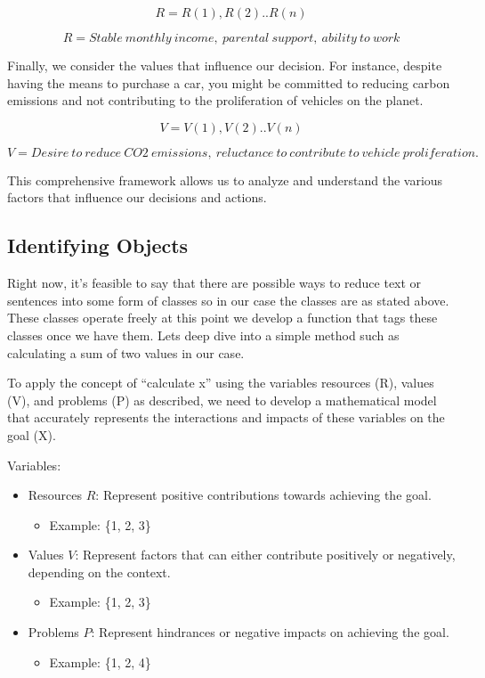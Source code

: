 \documentclass{article}
\begin{document}
	\[ 
	R= {R(1), R(2)..R(n)} 
	\]
	
	\[ 
	R= Stable \ monthly\ income, \ parental \ support, \ ability\  to \ work
	\]

Finally, we consider the values that influence our decision. For instance, despite having the means to purchase a car, you might be committed to reducing carbon emissions and not contributing to the proliferation of vehicles on the planet.

	\[ 
	V= {V(1), V(2)..V(n)} 
	\]
	
	\[ 
	V= Desire \ to \ reduce \ CO2 \ emissions, \ reluctance \ to \ contribute \ to \ vehicle \ proliferation. 
	\]

This comprehensive framework allows us to analyze and understand the various factors that influence our decisions and actions.

\subsection{Identifying Objects}

Right now, it's feasible to say that there are possible ways to reduce text or sentences into some form of classes so in our case the classes are as stated above. These classes operate freely at this point we develop a function that tags these classes once we have them. Lets deep dive into a simple method such as calculating a sum of two values in our case.

To apply the concept of ``calculate x'' using the variables resources (R), values (V), and problems (P) as  described, we need to develop a mathematical model that accurately represents the interactions and impacts of these variables on the goal (X).

Variables:

\begin{itemize}
    \item Resources \( R \): Represent positive contributions towards achieving the goal.
    \begin{itemize}
        \item Example: \{1, 2, 3\}
    \end{itemize}
    \item Values \( V \): Represent factors that can either contribute positively or negatively, depending on the context.
    \begin{itemize}
        \item Example: \{1, 2, 3\}
    \end{itemize}
    \item Problems \( P \): Represent hindrances or negative impacts on achieving the goal.
    \begin{itemize}
        \item Example: \{1, 2, 4\}
    \end{itemize}
\end{itemize}
\end{document}
